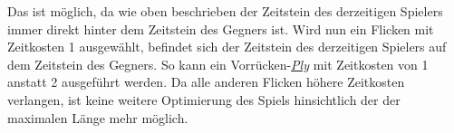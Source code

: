 \begin{table}[!ht]
    \centering
    \vspace{5pt}
    \caption{Die vier Flicken mit Zeitkosten 1}
    \label{tabelle:flicken-mit-zeitkosten-1}
    \vspace*{-0.35cm}
\end{table}

Das ist möglich, da wie oben beschrieben der Zeitstein des derzeitigen Spielers immer direkt hinter dem Zeitstein des Gegners ist. Wird nun ein Flicken mit Zeitkosten 1 ausgewählt, befindet sich der Zeitstein des derzeitigen Spielers auf dem Zeitstein des Gegners. So kann ein Vorrücken-\hyperref[text:ply]{\emph{Ply}} mit Zeitkosten von 1 anstatt 2 ausgeführt werden. Da alle anderen Flicken höhere Zeitkosten verlangen, ist keine weitere Optimierung des Spiels hinsichtlich der der maximalen Länge mehr möglich.

